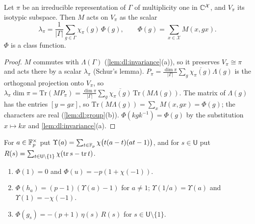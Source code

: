 \begin{lemma}\label{lem:dl:schur}
Let $\pi$ be an irreducible representation of $\Gamma$ of multiplicity one in
$\mathbb C^{\mathcal X}$, and $V_\pi$ its isotypic subspace. Then $M$ acts on $V_\pi$
as the scalar
\[
  \lambda_\pi=\frac1{|\Gamma|}\sum_{g\in\Gamma}\chi_\pi(g)\,\Phi(g),\qquad
  \Phi(g)=\sum_{x\in\mathcal X}M(x,gx).
\]
$\Phi$ is a class function.
\end{lemma}

\begin{proof}
$M$ commutes with $\Lambda(\Gamma)$ (\cref{lem:dl:invariance}(a)), so it
preserves $V_\pi\cong\pi$ and acts there by a scalar $\lambda_\pi$ (Schur's
lemma). $P_\pi=\frac{\dim\pi}{|\Gamma|}\sum_g\overline{\chi_\pi(g)}\Lambda(g)$ is
the orthogonal projection onto $V_\pi$, so
$\lambda_\pi\dim\pi=\mathrm{Tr}(MP_\pi)
=\frac{\dim\pi}{|\Gamma|}\sum_g\overline{\chi_\pi(g)}\,\mathrm{Tr}(M\Lambda(g))$.
The matrix of $\Lambda(g)$ has the entries $[y=gx]$, so
$\mathrm{Tr}(M\Lambda(g))=\sum_xM(x,gx)=\Phi(g)$; the characters are real
(\cref{lem:dl:group}(b)). $\Phi(kgk^{-1})=\Phi(g)$ by the substitution
$x\mapsto kx$ and \cref{lem:dl:invariance}(a).
\end{proof}

For $a\in\mathbb F_p^\times$ put $\Upsilon(a)=\sum_{t\in\mathbb F_p}\chi\big(t(a-t)(at-1)\big)$,
and for $s\in\mathsf U$ put
$R(s)=\sum_{t\in\mathsf U\setminus\{1\}}\chi(\operatorname{tr} s-\operatorname{tr} t)$.

\begin{lemma}\label{lem:dl:Phi}
\begin{enumerate}[label=\textup{(\roman*)}]
\item $\Phi(1)=0$ and $\Phi(u)=-p(1+\chi(-1))$.
\item $\Phi(h_a)=(p-1)(\Upsilon(a)-1)$ for $a\ne1$; $\Upsilon(1/a)=\Upsilon(a)$
  and $\Upsilon(1)=-\chi(-1)$.
\item $\Phi(g_s)=-(p+1)\,\eta(s)\,R(s)$ for $s\in\mathsf U\setminus\{1\}$.
\end{enumerate}
\end{lemma}

